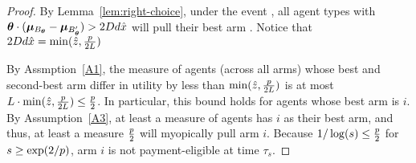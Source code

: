 \begin{proof}
By Lemma~\ref{lem:right-choice},
under the event ,
all agent types \AgV with
$\bm{\theta} \cdot (\bm{\mu}_{B_{\bm{\theta}}} - \bm{\mu}_{B'_{\bm{\theta}}})
> 2D d \hat{x}$
will pull their best arm \Best{\AgV}.
Notice that $2D d \hat{x}
= \min(\hat{z}, \frac{p}{2 L})$

By Assmption~\ref{A1},
the measure of agents (across all arms)
whose best and second-best arm differ in utility by less
than $\min(\hat{z}, \frac{p}{2 L})$
is at most
$L \cdot \min(\hat{z}, \frac{p}{2 L})
\leq \frac{p}{2}$.
In particular, this bound holds for agents whose best arm is $i$.
By Assumption~\ref{A3}, at least a measure \MinProb of agents has $i$
as their best arm, and thus, at least a measure $\frac{p}{2}$
will myopically pull arm $i$.
Because $1/\log(s) \leq \frac{p}{2}$ for
$s \geq \exp(2/p)$, arm $i$ is not payment-eligible at time
$\tau_s$.
\end{proof}
